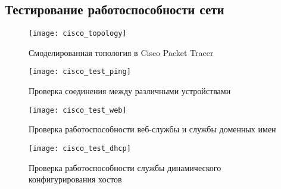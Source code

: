\documentclass[14pt, a4paper]{extarticle}
\begin{document}
\begin{appendices}
\section{Тестирование работоспособности сети}
\label{apx:test}

\begin{figure}[H]
  \centering
  \texttt{[image: cisco\_topology]}
  \caption{Смоделированная топология в Cisco Packet Tracer}
  \label{fig:cisco_topology}
\end{figure}

\begin{figure}[H]
  \centering
  \texttt{[image: cisco\_test\_ping]}
  \caption{Проверка соединения между различными устройствами}
  \label{fig:cisco_test_ping}
\end{figure}

\begin{figure}[H]
  \centering
  \texttt{[image: cisco\_test\_web]}
  \caption{Проверка работоспособности веб-службы и службы доменных имен}
  \label{fig:cisco_test_web}
\end{figure}

\begin{figure}[H]
  \centering
  \texttt{[image: cisco\_test\_dhcp]}
  \caption{Проверка работоспособности службы динамического конфигурирования хостов}
  \label{fig:cisco_test_dhcp}
\end{figure}

\end{appendices}
\end{document}
